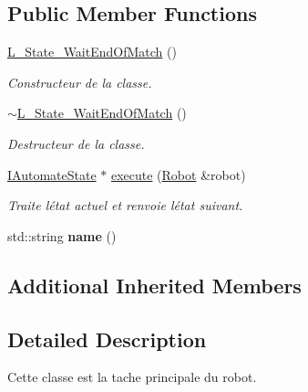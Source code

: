 \subsection*{Public Member Functions}
\begin{DoxyCompactItemize}
\item 
\mbox{\label{classL__State__WaitEndOfMatch_af3dcadc62598527c1466435bafc3cc06}} 
\hyperlink{classL__State__WaitEndOfMatch_af3dcadc62598527c1466435bafc3cc06}{L\+\_\+\+State\+\_\+\+Wait\+End\+Of\+Match} ()
\begin{DoxyCompactList}\small\item\em Constructeur de la classe. \end{DoxyCompactList}\item 
\mbox{\label{classL__State__WaitEndOfMatch_a118f6b4e0b8b8344b5adaf98b2882e7d}} 
\hyperlink{classL__State__WaitEndOfMatch_a118f6b4e0b8b8344b5adaf98b2882e7d}{$\sim$\+L\+\_\+\+State\+\_\+\+Wait\+End\+Of\+Match} ()
\begin{DoxyCompactList}\small\item\em Destructeur de la classe. \end{DoxyCompactList}\item 
\hyperlink{classIAutomateState}{I\+Automate\+State} $\ast$ \hyperlink{classL__State__WaitEndOfMatch_a537e556e995b79725420de71b6ecce19}{execute} (\hyperlink{classRobot}{Robot} \&robot)
\begin{DoxyCompactList}\small\item\em Traite l\textquotesingle{}état actuel et renvoie l\textquotesingle{}état suivant. \end{DoxyCompactList}\item 
\mbox{\label{classL__State__WaitEndOfMatch_a496aecb53a222b60de90ab69a2eef475}} 
std\+::string {\bfseries name} ()
\end{DoxyCompactItemize}
\subsection*{Additional Inherited Members}


\subsection{Detailed Description}
Cette classe est la tache principale du robot. 

